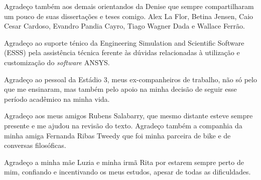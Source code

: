 Agradeço também aos demais orientandos da Denise que sempre compartilharam um pouco de suas dissertações e teses comigo. Alex La Flor,  Betina Jensen, Caio Cesar Cardoso, Evandro Pandia Cayro, Tiago Wagner Dada e Wallace Ferrão. 

Agradeço ao suporte ténico da Engineering Simulation and Scientific Software (ESSS) pela assistência técnica ferente às dúvidas relacionadas à utilização e customização do \textit{software} ANSYS.

Agradeço ao pessoal da Estádio 3, meus ex-companheiros de trabalho, não só pelo que me ensinaram, mas também pelo apoio na minha decisão de seguir esse período acadêmico na minha vida.

Agradeço aos meus amigos Rubens Salabarry, que mesmo distante esteve sempre presente e me ajudou na revisão do texto. Agradeço também a companhia da minha amiga Fernanda Ribas Tweedy que foi minha parceira de bike e de conversas filosóficas.

Agradeço a minha mãe Luzia e minha irmã Rita por estarem sempre perto de mim, confiando e incentivando os meus estudos, apesar de todas as dificuldades.



